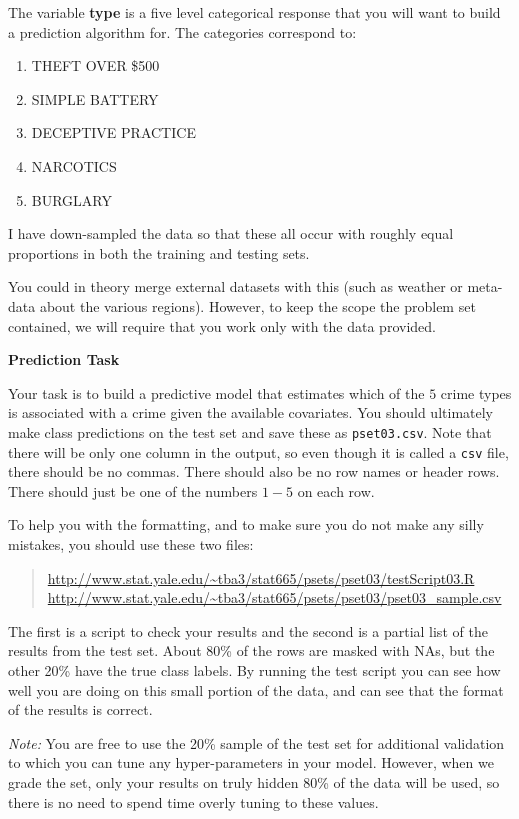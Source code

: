 \documentclass[12pt]{article}
\begin{document}
The variable \textbf{type} is
a five level categorical response that you will want to build a prediction
algorithm for. The categories correspond to:
\begin{enumerate}
\item THEFT OVER \$500
\item SIMPLE BATTERY
\item DECEPTIVE PRACTICE
\item NARCOTICS
\item BURGLARY
\end{enumerate}
I have down-sampled the data so that these all occur with roughly equal proportions
in both the training and testing sets.

You could in theory merge external datasets with this (such as weather or meta-data
about the various regions). However, to keep the scope the problem set contained, we
will require that you work only with the data provided.

\textbf{Prediction Task}

Your task is to build a predictive model that estimates which of the $5$ crime
types is associated with a crime given the available covariates. You should
ultimately make class predictions on the test set and save these as
\texttt{pset03.csv}. Note that there will be only one column in the output,
so even though it is called a \texttt{csv} file, there should be no commas.
There should also be no row names or header rows. There should just be one
of the numbers $1-5$ on each row.

To help you with the formatting, and to make sure you do not make any silly
mistakes, you should use these two files:
\begin{quote}
\url{http://www.stat.yale.edu/~tba3/stat665/psets/pset03/testScript03.R} \\
\url{http://www.stat.yale.edu/~tba3/stat665/psets/pset03/pset03_sample.csv}
\end{quote}
The first is a script to check your results and the second is a partial list of
the results from the test set. About 80\% of the rows are masked with NAs, but
the other 20\% have the true class labels. By running the test script you can
see how well you are doing on this small portion of the data, and can see that
the format of the results is correct.

\textit{Note:} You are free to use the 20\% sample of the test set for additional
validation to which you can tune any hyper-parameters in your model. However,
when we grade the set, only your results on truly hidden 80\% of the data will
be used, so there is no need to spend time overly tuning to these values.
\end{document}
